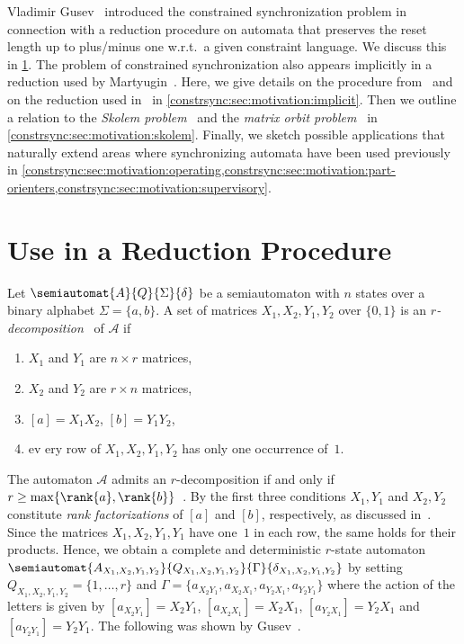 
Vladimir Gusev~\cite{Gusev2012} introduced the constrained synchronization problem
in connection with a reduction procedure on automata
that preserves the reset length up to plus/minus one w.r.t.~a given constraint language. 
We discuss this in \cref{constrsync:sec:motivation:reduction}.
The problem of constrained synchronization also appears implicitly 
in a reduction used by Martyugin~\cite{Martyugin14}. %
Here, we give details on the procedure from~\cite{Gusev2012} and on
the reduction used in~\cite{Martyugin14} in \cref{constrsync:sec:motivation:implicit}.
Then we outline a relation to the \emph{Skolem problem}~\cite{BLONDEL2002,DBLP:conf/rp/OuaknineW12} and the \emph{matrix orbit problem}~\cite{KannanLipton1986} in \cref{constrsync:sec:motivation:skolem}.
Finally, we sketch possible applications that naturally extend
areas where synchronizing automata have been used previously
in \cref{constrsync:sec:motivation:operating,constrsync:sec:motivation:part-orienters,constrsync:sec:motivation:supervisory}.

\section{Use in a Reduction Procedure}
\label{constrsync:sec:motivation:reduction}

Let $\semiautomat{A}{Q}{\Sigma}{\delta}$ be a semiautomaton with $n$ states
over a binary alphabet $\Sigma = \{a,b\}$. A set of matrices $X_1, X_2, Y_1, Y_2$
over $\{0,1\}$ %
is an \emph{$r$-decomposition}~\cite{Gusev2012} of $\mathcal A$
if
\begin{enumerate}
\item $X_1$ and $Y_1$ are $n \times r$ matrices,
\item $X_2$ and $Y_2$ are $r \times n$ matrices,
\item $[a] = X_1 X_2$, $[b] = Y_1 Y_2$,
\item ev ery row of $X_1, X_2, Y_1, Y_2$ has only one occurrence of~$1$.
\end{enumerate}
The automaton $\mathcal A$ admits an $r$-decomposition if and only if $r \ge \max\{\rank{a},\rank{b}\}$~\cite{Gusev2012}.
By the first three conditions $X_1, Y_1$ and $X_2,Y_2$ constitute
\emph{rank factorizations}
of $[a]$ and $[b]$, respectively, as discussed in~\cite{piziak99}.
Since the matrices $X_1, X_2, Y_1, Y_1$ have one~$1$ in each row,
the same holds for their products.
Hence, we obtain a complete and deterministic $r$-state automaton
$\semiautomat{A_{X_1, X_2, Y_1, Y_2}}{Q_{X_1, X_2, Y_1, Y_2}}{\Gamma}{\delta_{X_1,X_2, Y_1, Y_2}}$
by setting $Q_{X_1, X_2, Y_1, Y_2} = \{1,\ldots,r\}$ and $\Gamma = \{ a_{X_2Y_1}, a_{X_2X_1}, a_{Y_2X_1}, a_{Y_2Y_1} \}$
where the action of the letters is given
by $[a_{X_2Y_1}] = X_2 Y_1$, $[a_{X_2X_1}] = X_2X_1$, $[a_{Y_2X_1}] = Y_2 X_1$
and $[a_{Y_2 Y_1}] = Y_2 Y_1$. %
The following was shown by Gusev~\cite[Prop.~5]{Gusev2012}.

